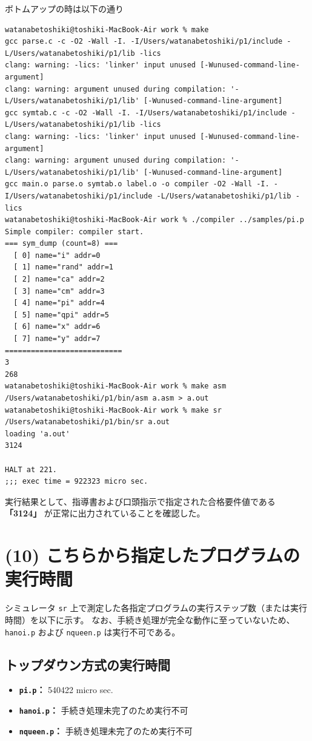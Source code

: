 \documentclass[11pt,a4paper,dvipdfmx]{bxjsarticle}
\begin{document}
ボトムアップの時は以下の通り
\begin{lstlisting}[breaklines=true, basicstyle=\footnotesize\ttfamily, frame=single, caption={pi.p のボトムアップの実行結果と実行時間}]
watanabetoshiki@toshiki-MacBook-Air work % make
gcc parse.c -c -O2 -Wall -I. -I/Users/watanabetoshiki/p1/include -L/Users/watanabetoshiki/p1/lib -lics
clang: warning: -lics: 'linker' input unused [-Wunused-command-line-argument]
clang: warning: argument unused during compilation: '-L/Users/watanabetoshiki/p1/lib' [-Wunused-command-line-argument]
gcc symtab.c -c -O2 -Wall -I. -I/Users/watanabetoshiki/p1/include -L/Users/watanabetoshiki/p1/lib -lics
clang: warning: -lics: 'linker' input unused [-Wunused-command-line-argument]
clang: warning: argument unused during compilation: '-L/Users/watanabetoshiki/p1/lib' [-Wunused-command-line-argument]
gcc main.o parse.o symtab.o label.o -o compiler -O2 -Wall -I. -I/Users/watanabetoshiki/p1/include -L/Users/watanabetoshiki/p1/lib -lics
watanabetoshiki@toshiki-MacBook-Air work % ./compiler ../samples/pi.p
Simple compiler: compiler start.
=== sym_dump (count=8) ===
  [ 0] name="i" addr=0
  [ 1] name="rand" addr=1
  [ 2] name="ca" addr=2
  [ 3] name="cm" addr=3
  [ 4] name="pi" addr=4
  [ 5] name="qpi" addr=5
  [ 6] name="x" addr=6
  [ 7] name="y" addr=7
===========================
3
268
watanabetoshiki@toshiki-MacBook-Air work % make asm
/Users/watanabetoshiki/p1/bin/asm a.asm > a.out
watanabetoshiki@toshiki-MacBook-Air work % make sr
/Users/watanabetoshiki/p1/bin/sr a.out
loading 'a.out'
3124

HALT at 221.
;;; exec time = 922323 micro sec.
\end{lstlisting}

実行結果として、指導書および口頭指示で指定された合格要件値である \textbf{ 「3124」 } が正常に出力されていることを確認した。

\section*{(10) こちらから指定したプログラムの実行時間}
シミュレータ \texttt{sr} 上で測定した各指定プログラムの実行ステップ数（または実行時間）を以下に示す。
なお、手続き処理が完全な動作に至っていないため、\texttt{hanoi.p} および \texttt{nqueen.p} は実行不可である。

\subsection*{トップダウン方式の実行時間}
\begin{itemize}
    \item \textbf{\texttt{pi.p}：} 540422 micro sec.
    \item \textbf{\texttt{hanoi.p}：} 手続き処理未完了のため実行不可
    \item \textbf{\texttt{nqueen.p}：} 手続き処理未完了のため実行不可
\end{itemize}
\end{document}
